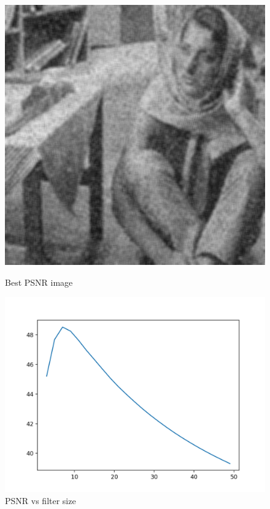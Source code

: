 \documentclass{article}
\begin{document}
    \begin{figure}[!htb]
      \includegraphics[scale=0.3]{./basic_denoising/barbara/average_best_sp.png}
      \caption{Best PSNR image}
    \endminipage \hfill
      \includegraphics[scale=.45]{./basic_denoising/barbara/average_psnr_sp.png}
      \caption{PSNR vs filter size}
    \endminipage
    \end{figure}
    
\end{document}
